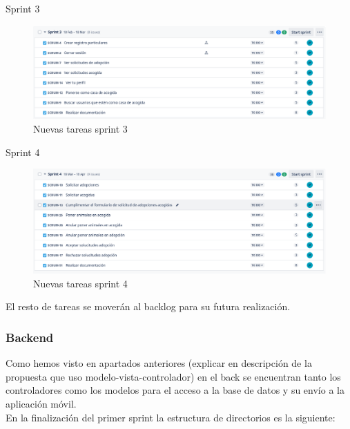 Sprint 3 \\
\begin{figure}[H]
	\centering
	\includegraphics[width=1\linewidth]{newSprint3}
	\caption{Nuevas tareas sprint 3}
	\label{fig:newsprint3}
\end{figure}

Sprint 4 \\
\begin{figure}[H]
	\centering
	\includegraphics[width=1\linewidth]{newSprint4}
	\caption{Nuevas tareas sprint 4}
	\label{fig:newsprint4}
\end{figure}

El resto de tareas se moverán al backlog para su futura realización. \\ 

\subsubsection{Backend}

Como hemos visto en apartados anteriores (explicar en descripción de la propuesta que uso modelo-vista-controlador) en el back se encuentran tanto los controladores como los modelos para el acceso a la base de datos y su envío a la aplicación móvil. \\

En la finalización del primer sprint la estructura de directorios es la siguiente:

